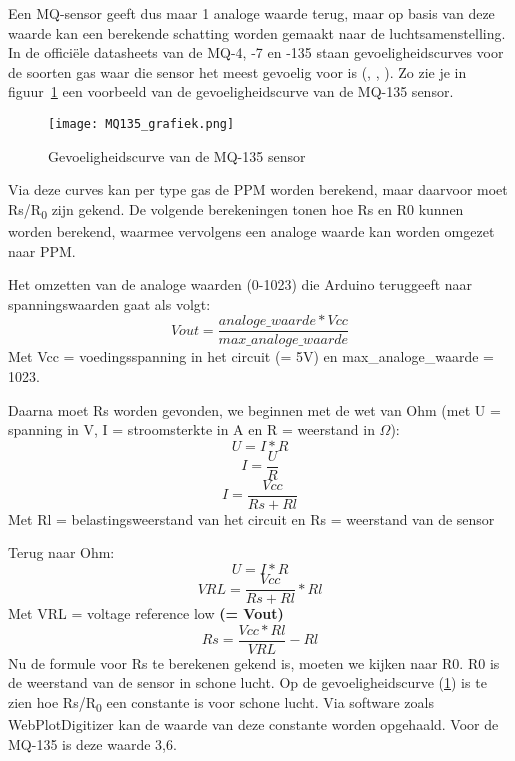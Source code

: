 Een MQ-sensor geeft dus maar 1 analoge waarde terug, maar op basis van deze waarde kan een berekende schatting worden gemaakt naar de luchtsamenstelling. In de officiële datasheets van de MQ-4, -7 en -135 staan gevoeligheidscurves voor de soorten gas waar die sensor het meest gevoelig voor is (\autocite{mq4}, \autocite{mq7}, \autocite{mq135}). Zo zie je in figuur~\ref{fig:MQ135_grafiek} een voorbeeld van de gevoeligheidscurve van de MQ-135 sensor.

\begin{figure}[h]
    \texttt{[image: MQ135\_grafiek.png]}
    \caption[Gevoeligheidscurve MQ-135]{Gevoeligheidscurve van de MQ-135 sensor \autocite{mq135}}
    \label{fig:MQ135_grafiek}
\end{figure}

\pagebreak

Via deze curves kan per type gas de PPM worden berekend, maar daarvoor moet Rs/R\textsubscript{0} zijn gekend. De volgende berekeningen tonen hoe Rs en R0 kunnen worden berekend, waarmee vervolgens een analoge waarde kan worden omgezet naar PPM.

Het omzetten van de analoge waarden (0-1023) die Arduino teruggeeft naar spanningswaarden gaat als volgt:
\begin{equation}
    Vout = \frac{analoge\_waarde * Vcc}{max\_analoge\_waarde}
\end{equation}
Met Vcc = voedingsspanning in het circuit (= 5V) en max\_analoge\_waarde = 1023.

Daarna moet Rs worden gevonden, we beginnen met de wet van Ohm (met U = spanning in V, I = stroomsterkte in A en R = weerstand in $\Omega$):
\begin{equation}
    U = I * R
\end{equation}
\begin{equation}
    I = \frac{U}{R}
\end{equation}
\begin{equation}
    I = \frac{Vcc}{Rs+Rl}
\end{equation}
Met Rl = belastingsweerstand van het circuit en Rs = weerstand van de sensor

Terug naar Ohm:
\begin{equation}
    U = I * R
\end{equation}
\begin{equation}
    VRL = \frac{Vcc}{Rs + Rl} * Rl
\end{equation}
Met VRL = voltage reference low \textbf{(= Vout)}
\begin{equation}
    Rs = \frac{Vcc * Rl}{VRL} - Rl
\end{equation}
Nu de formule voor Rs te berekenen gekend is, moeten we kijken naar R0. R0 is de weerstand van de sensor in schone lucht. Op de gevoeligheidscurve (\ref{fig:MQ135_grafiek}) is te zien hoe Rs/R\textsubscript{0} een constante is voor schone lucht. Via software zoals WebPlotDigitizer \autocite{Rohatgi2024} kan de waarde van deze constante worden opgehaald. Voor de MQ-135 is deze waarde 3,6.

